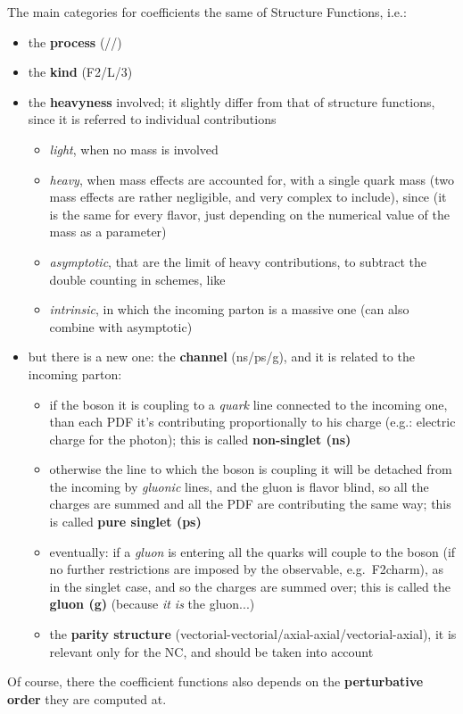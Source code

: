 The main categories for coefficients the same of Structure Functions, i.e.:
\begin{itemize}
\item the \textbf{process} (\elmag/\nc/\cc)
\item the \textbf{kind} (F2/L/3)
\item the \textbf{heavyness} involved; it slightly differ from that of
  structure functions, since it is referred to individual contributions
  \begin{itemize}
    \item \textit{light}, when no mass is involved
    \item \textit{heavy}, when mass effects are accounted for, with a single
      quark mass (two mass effects are rather negligible, and very complex to
      include), since (it is the same for every flavor, just depending on the
      numerical value of the mass as a parameter)
    \item \textit{asymptotic}, that are the limit of heavy contributions, to
      subtract the double counting in \gmvfns schemes, like \fonll
    \item \textit{intrinsic}, in which the incoming parton is a massive one
      (can also combine with asymptotic)
  \end{itemize}
\item but there is a new one: the \textbf{channel} (ns/ps/g), and it is related to the
  incoming parton:
  \begin{itemize}
    \item if the \ew boson it is coupling to a \textit{quark} line connected to the incoming
      one, than each PDF it's contributing proportionally to his charge (e.g.:
      electric charge for the photon); this is called \textbf{non-singlet (ns)}
    \item otherwise the line to which the \ew boson is coupling it will be detached
      from the incoming  by \textit{gluonic} lines, and the gluon is flavor blind, so
      all the charges are summed and all the PDF are contributing the same way;
      this is called \textbf{pure singlet (ps)}
    \item eventually: if a \textit{gluon} is entering all the quarks will couple to the \ew
      boson (if no further restrictions are imposed by the observable, e.g.\
      F2charm), as in the singlet case, and so the charges are summed over; this
      is called the \textbf{gluon (g)} (because \textit{it is} the gluon...)
    \item the \textbf{parity structure}
      (vectorial-vectorial/axial-axial/vectorial-axial), it is relevant only for
      the NC, and should be taken into account
  \end{itemize}
\end{itemize}
Of course, there the coefficient functions also depends on the
\textbf{perturbative order} they are computed at.

